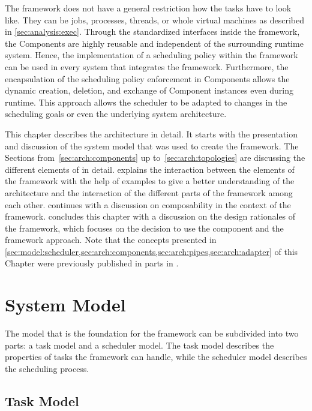 The framework does not have a general restriction how the tasks have to look like. They can be jobs, processes, threads, or whole virtual machines as described in \cref{sec:analysis:exec}. Through the standardized interfaces inside the framework, the Components are highly reusable and independent of the surrounding runtime system. Hence, the implementation of a scheduling policy within the \cobas{} framework can be used in every system that integrates the framework. Furthermore, the encapsulation of the scheduling policy enforcement in Components allows the dynamic creation, deletion, and exchange of Component instances even during runtime. This approach allows the scheduler to be adapted to changes in the scheduling goals or even the underlying system architecture.

This chapter describes the \cobas{} architecture in detail. It starts with the presentation and discussion of the system model that was used to create the framework. The Sections from~\ref{sec:arch:components} up to~\ref{sec:arch:topologies} are discussing the different elements of \cobas{} in detail.  explains the interaction between the elements of the \cobas{} framework with the help of examples to give a better understanding of the architecture and the interaction of the different parts of the framework among each other.  continues with a discussion on composability in the context of the \cobas{} framework.  concludes this chapter with a discussion on the design rationales of the \cobas{} framework, which focuses on the decision to use the component and the framework approach. Note that the concepts presented in \cref{sec:model:scheduler,sec:arch:components,sec:arch:pipes,sec:arch:adapter} of this Chapter were previously published in parts in \textcite{Busse-2015-CoBaS}.

\section{System Model}%
\label{sec:model}

The model that is the foundation for the \cobas{} framework can be subdivided into two parts: a task model and a scheduler model. The task model describes the properties of tasks the \cobas{} framework can handle, while the scheduler model describes the scheduling process.

\subsection{Task Model}

